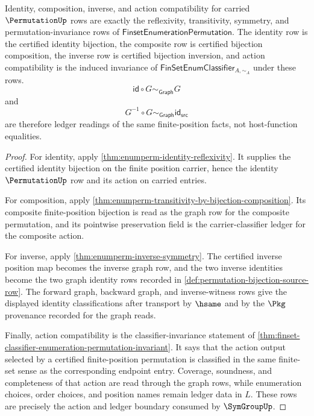 \begin{theorem}
\label{thm:permutation-composition-inverse-action-obligation}
Identity, composition, inverse, and action compatibility for carried $\PermutationUp$ rows are exactly the reflexivity, transitivity, symmetry, and permutation-invariance rows of $\mathsf{FinsetEnumerationPermutation}$. The identity row is the certified identity bijection, the composite row is certified bijection composition, the inverse row is certified bijection inversion, and action compatibility is the induced invariance of $\mathsf{FinSetEnumClassifier}_{A,\sim_A}$ under these rows.
$$
\mathsf{id}\circ G \sim_{\mathsf{Graph}} G
$$
and
$$
G^{-1}\circ G \sim_{\mathsf{Graph}} \mathsf{id}_{\mathsf{src}}
$$
are therefore ledger readings of the same finite-position facts, not host-function equalities.
\end{theorem}
\begin{proof}
For identity, apply \autoref{thm:enumperm-identity-reflexivity}. It supplies the certified identity bijection on the finite position carrier, hence the identity $\PermutationUp$ row and its action on carried entries.

For composition, apply \autoref{thm:enumperm-transitivity-by-bijection-composition}. Its composite finite-position bijection is read as the graph row for the composite permutation, and its pointwise preservation field is the carrier-classifier ledger for the composite action.

For inverse, apply \autoref{thm:enumperm-inverse-symmetry}. The certified inverse position map becomes the inverse graph row, and the two inverse identities become the two graph identity rows recorded in \autoref{def:permutation-bijection-source-row}. The forward graph, backward graph, and inverse-witness rows give the displayed identity classifications after transport by $\hsame$ and by the $\Pkg$ provenance recorded for the graph reads.

Finally, action compatibility is the classifier-invariance statement of \autoref{thm:finset-classifier-enumeration-permutation-invariant}. It says that the action output selected by a certified finite-position permutation is classified in the same finite-set sense as the corresponding endpoint entry. Coverage, soundness, and completeness of that action are read through the graph rows, while enumeration choices, order choices, and position names remain ledger data in $L$. These rows are precisely the action and ledger boundary consumed by $\SymGroupUp$.
\end{proof}

